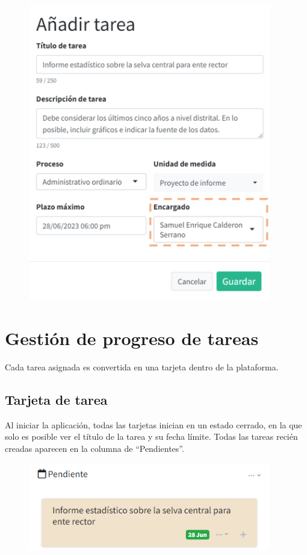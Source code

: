 \documentclass[
  letterpaper,
  DIV=11,
  numbers=noendperiod]{scrreprt}
\begin{document}
\begin{figure}

{\centering \includegraphics[width=4.16667in,height=\textheight]{./img/manual-user/new-task-assignee.png}

}

\end{figure}

\hypertarget{gestiuxf3n-de-progreso-de-tareas}{%
\section{Gestión de progreso de
tareas}\label{gestiuxf3n-de-progreso-de-tareas}}

Cada tarea asignada es convertida en una tarjeta dentro de la
plataforma.

\hypertarget{tarjeta-de-tarea}{%
\subsection{Tarjeta de tarea}\label{tarjeta-de-tarea}}

Al iniciar la aplicación, todas las tarjetas inician en un estado
cerrado, en la que solo es posible ver el título de la tarea y su fecha
límite. Todas las tareas recién creadas aparecen en la columna de
``Pendientes''.

\begin{figure}

{\centering \includegraphics[width=4.16667in,height=\textheight]{./img/manual-user/task-closed.png}

}

\end{figure}
\end{document}
